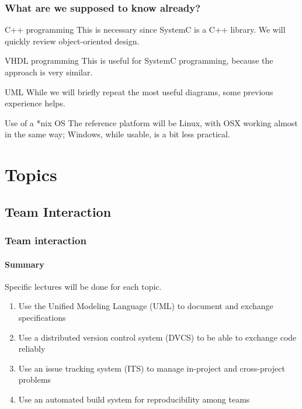 \begin{frame}
\frametitle{What are we supposed to know already?}

{\small
\begin{block}{C++ programming}
This is necessary since SystemC is a C++ library. We will quickly review object-oriented design.
\end{block}
\begin{block}{VHDL programming}
This is useful for SystemC programming, because the approach is very similar.
\end{block}
\begin{block}{UML}
While we will briefly repeat the most useful diagrams, some previous experience helps.
\end{block}
\begin{block}{Use of a *nix OS}
The reference platform will be Linux, with OSX working almost in the same way; Windows, while usable, is a bit less practical.
\end{block}
}
\end{frame}

\section{Topics}

\subsection{Team Interaction}

\begin{frame}
\frametitle{Team interaction}
\framesubtitle{Summary}
Specific lectures will be done for each topic.
\begin{enumerate}
\item Use the Unified Modeling Language (UML) to document and exchange specifications
\item Use a distributed version control system (DVCS) to be able to exchange code reliably
\item Use an issue tracking system (ITS) to manage in-project and cross-project problems
\item Use an automated build system for reproducibility among teams
\end{enumerate}
\end{frame}

